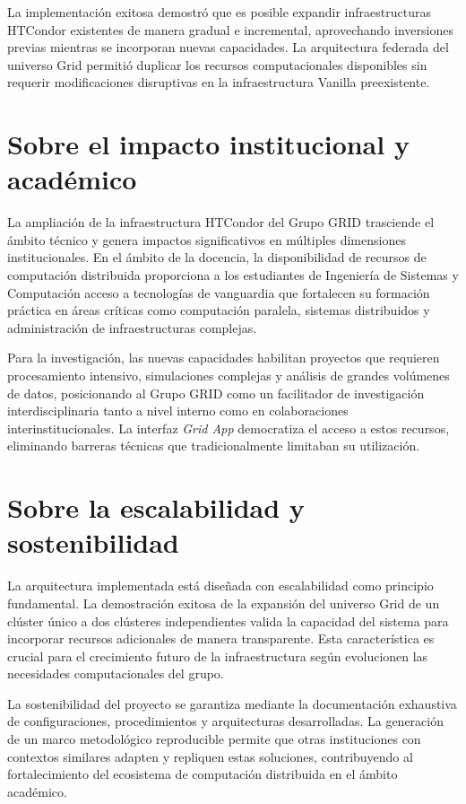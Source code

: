 La implementación exitosa demostró que es posible expandir infraestructuras HTCondor existentes de manera gradual e incremental, aprovechando inversiones previas mientras se incorporan nuevas capacidades. La arquitectura federada del universo Grid permitió duplicar los recursos computacionales disponibles sin requerir modificaciones disruptivas en la infraestructura Vanilla preexistente.

\section{Sobre el impacto institucional y académico}
\noindent

La ampliación de la infraestructura HTCondor del Grupo GRID trasciende el ámbito técnico y genera impactos significativos en múltiples dimensiones institucionales. En el ámbito de la docencia, la disponibilidad de recursos de computación distribuida proporciona a los estudiantes de Ingeniería de Sistemas y Computación acceso a tecnologías de vanguardia que fortalecen su formación práctica en áreas críticas como computación paralela, sistemas distribuidos y administración de infraestructuras complejas.

Para la investigación, las nuevas capacidades habilitan proyectos que requieren procesamiento intensivo, simulaciones complejas y análisis de grandes volúmenes de datos, posicionando al Grupo GRID como un facilitador de investigación interdisciplinaria tanto a nivel interno como en colaboraciones interinstitucionales. La interfaz \textit{Grid App} democratiza el acceso a estos recursos, eliminando barreras técnicas que tradicionalmente limitaban su utilización.

\section{Sobre la escalabilidad y sostenibilidad}
\noindent

La arquitectura implementada está diseñada con escalabilidad como principio fundamental. La demostración exitosa de la expansión del universo Grid de un clúster único a dos clústeres independientes valida la capacidad del sistema para incorporar recursos adicionales de manera transparente. Esta característica es crucial para el crecimiento futuro de la infraestructura según evolucionen las necesidades computacionales del grupo.

La sostenibilidad del proyecto se garantiza mediante la documentación exhaustiva de configuraciones, procedimientos y arquitecturas desarrolladas. La generación de un marco metodológico reproducible permite que otras instituciones con contextos similares adapten y repliquen estas soluciones, contribuyendo al fortalecimiento del ecosistema de computación distribuida en el ámbito académico.

